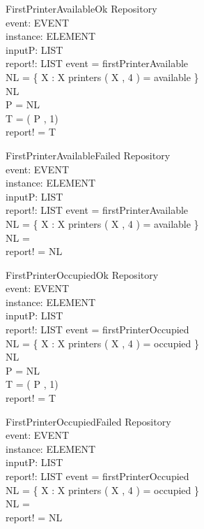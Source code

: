 \begin{schema}{FirstPrinterAvailableOk}
\Delta Repository \\
event: EVENT \\
instance: ELEMENT \\
inputP: LIST \\
report!: LIST
\where event = firstPrinterAvailable \\
NL = \{ X : \nat \bbar X \mem printers \land \nth( X , 4 ) = available \} \\
NL \neq \emptyset \\
P = \head NL \\
T = \nth( P , 1) \\
report! = T
\end{schema}

\begin{schema}{FirstPrinterAvailableFailed}
\Delta Repository \\
event: EVENT \\
instance: ELEMENT \\
inputP: LIST \\
report!: LIST
\where event = firstPrinterAvailable \\
NL = \{ X : \nat \bbar X \mem printers \land \nth( X , 4 ) = available \} \\
NL = \emptyset \\
report! = NL
\end{schema}

\begin{schema}{FirstPrinterOccupiedOk}
\Delta Repository \\
event: EVENT \\
instance: ELEMENT \\
inputP: LIST \\
report!: LIST
\where event = firstPrinterOccupied \\
NL = \{ X : \nat \bbar X \mem printers \land \nth( X , 4 ) = occupied \} \\
NL \neq \emptyset \\
P = \head NL \\
T = \nth( P , 1) \\
report! = T
\end{schema}

\begin{schema}{FirstPrinterOccupiedFailed}
\Delta Repository \\
event: EVENT \\
instance: ELEMENT \\
inputP: LIST \\
report!: LIST
\where event = firstPrinterOccupied \\
NL = \{ X : \nat \bbar X \mem printers \land \nth( X , 4 ) = occupied \} \\
NL = \emptyset \\
report! = NL
\end{schema}




